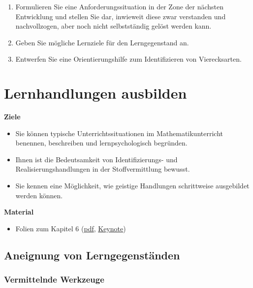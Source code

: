 \documentclass[
]{scrbook}
\providecommand{\tightlist}{%
  \setlength{\itemsep}{0pt}\setlength{\parskip}{0pt}}
\renewenvironment{quote}{
  \list{}{
	\leftmargin0.2cm   %
    \rightmargin\leftmargin
      	\def\FrameCommand
    {%
        {\color{quoteColor}\vrule width 2pt}%
        \hspace{0pt}%
    }%
    \MakeFramed{\advance \hsize -\width \FrameRestore}    \color{quoteColor}
    }
  \item\relax
}
{\endlist\color{black}\endMakeFramed}
\theoremstyle{definition}
\theoremstyle{definition}
\theoremstyle{definition}
\theoremstyle{definition}
\theoremstyle{remark}
\begin{document}
\begin{enumerate}
\def\labelenumi{\arabic{enumi}.}
\item
  Formulieren Sie eine Anforderungssituation in der Zone der nächsten Entwicklung und stellen Sie dar, inwieweit diese zwar verstanden und nachvollzogen, aber noch nicht selbstständig gelöst werden kann.
\item
  Geben Sie mögliche Lernziele für den Lerngegenstand an.
\item
  Entwerfen Sie eine Orientierungshilfe zum Identifizieren von Vierecksarten.
\end{enumerate}

\chapter{Lernhandlungen ausbilden}\label{lernhandlungen-ausbilden}

\begin{quote}
\textbf{Ziele}

\begin{itemize}
\tightlist
\item
  Sie können typische Unterrichtssituationen im Mathematikunterricht benennen, beschreiben und lernpsychologisch begründen.
\item
  Ihnen ist die Bedeutsamkeit von Identifizierungs- und Realisierungshandlungen in der Stoffvermittlung bewusst.
\item
  Sie kennen eine Möglichkeit, wie geistige Handlungen schrittweise ausgebildet werden können.
\end{itemize}

\textbf{Material}

\begin{itemize}
\tightlist
\item
  Folien zum Kapitel 6 (\href{files/Stoffdidaktik2024-06-LernhandlungenAusbilden.pdf}{pdf}, \href{files/Stoffdidaktik2024-06-LernhandlungenAusbilden.key}{Keynote})
\end{itemize}
\end{quote}

\section{Aneignung von Lerngegenständen}\label{aneignung-von-lerngegenstaenden}

\subsection{Vermittelnde Werkzeuge}\label{vermittelnde-werkzeuge}
\end{document}
